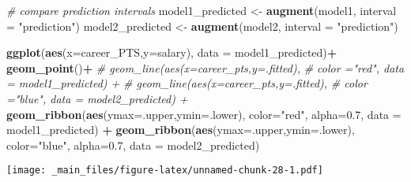 \documentclass[
]{book}
\newenvironment{Shaded}{\begin{snugshade}}{\end{snugshade}}
\newcommand{\AttributeTok}[1]{\textcolor[rgb]{0.13,0.29,0.53}{#1}}
\newcommand{\CommentTok}[1]{\textcolor[rgb]{0.56,0.35,0.01}{\textit{#1}}}
\newcommand{\FloatTok}[1]{\textcolor[rgb]{0.00,0.00,0.81}{#1}}
\newcommand{\FunctionTok}[1]{\textcolor[rgb]{0.13,0.29,0.53}{\textbf{#1}}}
\newcommand{\NormalTok}[1]{#1}
\newcommand{\OtherTok}[1]{\textcolor[rgb]{0.56,0.35,0.01}{#1}}
\newcommand{\SpecialCharTok}[1]{\textcolor[rgb]{0.81,0.36,0.00}{\textbf{#1}}}
\newcommand{\StringTok}[1]{\textcolor[rgb]{0.31,0.60,0.02}{#1}}
\begin{document}
\begin{Shaded}
\begin{Highlighting}[]
\CommentTok{\# compare prediction intervals}
\NormalTok{model1\_predicted }\OtherTok{\textless{}{-}} \FunctionTok{augment}\NormalTok{(model1, }\AttributeTok{interval =} \StringTok{"prediction"}\NormalTok{)}
\NormalTok{model2\_predicted }\OtherTok{\textless{}{-}} \FunctionTok{augment}\NormalTok{(model2, }\AttributeTok{interval =} \StringTok{"prediction"}\NormalTok{)}

  \FunctionTok{ggplot}\NormalTok{(}\FunctionTok{aes}\NormalTok{(}\AttributeTok{x=}\NormalTok{career\_PTS,}\AttributeTok{y=}\NormalTok{salary), }\AttributeTok{data =}\NormalTok{ model1\_predicted)}\SpecialCharTok{+}
  \FunctionTok{geom\_point}\NormalTok{()}\SpecialCharTok{+}
  \CommentTok{\# geom\_line(aes(x=career\_pts,y=.fitted),}
  \CommentTok{\#           color ="red", data = model1\_predicted) +}
  \CommentTok{\# geom\_line(aes(x=career\_pts,y=.fitted),}
  \CommentTok{\#          color ="blue", data = model2\_predicted) +}
  \FunctionTok{geom\_ribbon}\NormalTok{(}\FunctionTok{aes}\NormalTok{(}\AttributeTok{ymax=}\NormalTok{.upper,}\AttributeTok{ymin=}\NormalTok{.lower),}
              \AttributeTok{color=}\StringTok{"red"}\NormalTok{,}
              \AttributeTok{alpha=}\FloatTok{0.7}\NormalTok{,}
              \AttributeTok{data =}\NormalTok{ model1\_predicted) }\SpecialCharTok{+}
  \FunctionTok{geom\_ribbon}\NormalTok{(}\FunctionTok{aes}\NormalTok{(}\AttributeTok{ymax=}\NormalTok{.upper,}\AttributeTok{ymin=}\NormalTok{.lower),}
              \AttributeTok{color=}\StringTok{"blue"}\NormalTok{,}
              \AttributeTok{alpha=}\FloatTok{0.7}\NormalTok{,}
              \AttributeTok{data =}\NormalTok{ model2\_predicted)}
\end{Highlighting}
\end{Shaded}

\texttt{[image: \_main\_files/figure-latex/unnamed-chunk-28-1.pdf]}

\begin{Shaded}
\end{Shaded}
\end{document}
